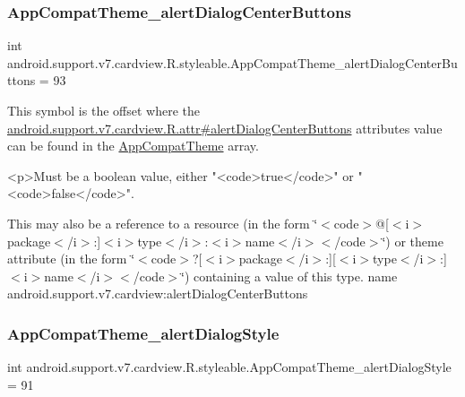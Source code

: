 \subsubsection{\texorpdfstring{App\+Compat\+Theme\+\_\+alert\+Dialog\+Center\+Buttons}{AppCompatTheme\_alertDialogCenterButtons}}
{\footnotesize\ttfamily int android.\+support.\+v7.\+cardview.\+R.\+styleable.\+App\+Compat\+Theme\+\_\+alert\+Dialog\+Center\+Buttons = 93\hspace{0.3cm}{\ttfamily [static]}}

This symbol is the offset where the \hyperlink{classandroid_1_1support_1_1v7_1_1cardview_1_1R_1_1attr_ae6d278326b134950f9bdf16085f24854}{android.\+support.\+v7.\+cardview.\+R.\+attr\#alert\+Dialog\+Center\+Buttons} attribute\textquotesingle{}s value can be found in the \hyperlink{classandroid_1_1support_1_1v7_1_1cardview_1_1R_1_1styleable_a52e6f69f954ecc2622d72c0b4d298938}{App\+Compat\+Theme} array.

\begin{DoxyVerb}      <p>Must be a boolean value, either "<code>true</code>" or "<code>false</code>".
\end{DoxyVerb}
 

This may also be a reference to a resource (in the form \char`\"{}$<$code$>$@\mbox{[}$<$i$>$package$<$/i$>$\+:\mbox{]}$<$i$>$type$<$/i$>$\+:$<$i$>$name$<$/i$>$$<$/code$>$\char`\"{}) or theme attribute (in the form \char`\"{}$<$code$>$?\mbox{[}$<$i$>$package$<$/i$>$\+:\mbox{]}\mbox{[}$<$i$>$type$<$/i$>$\+:\mbox{]}$<$i$>$name$<$/i$>$$<$/code$>$\char`\"{}) containing a value of this type.  name android.\+support.\+v7.\+cardview\+:alert\+Dialog\+Center\+Buttons \mbox{\label{classandroid_1_1support_1_1v7_1_1cardview_1_1R_1_1styleable_a09318e393d7df2f7968716e2d1c1a214}} 
\subsubsection{\texorpdfstring{App\+Compat\+Theme\+\_\+alert\+Dialog\+Style}{AppCompatTheme\_alertDialogStyle}}
{\footnotesize\ttfamily int android.\+support.\+v7.\+cardview.\+R.\+styleable.\+App\+Compat\+Theme\+\_\+alert\+Dialog\+Style = 91\hspace{0.3cm}{\ttfamily [static]}}

